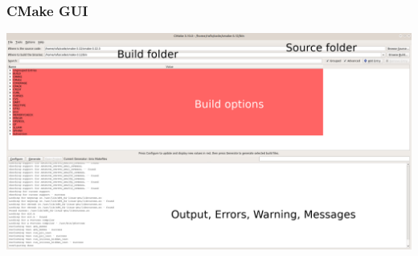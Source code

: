 \begin{frame}[plain]
  \frametitle{CMake GUI}

  \begin{center}
    \includegraphics[width=\textwidth]{img/cmake-gui.png}
  \end{center}

\end{frame}

